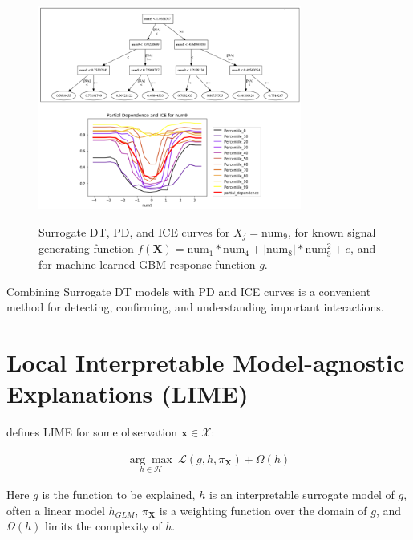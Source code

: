 \documentclass{article}
\begin{document}
\begin{figure}[htb]
	\begin{center}
		\label{fig:dt_surrogate_pdp_ice}
		\includegraphics[height=190pt]{img/dt_surrogate2_pdp_ice.png}
		\caption{Surrogate DT, PD, and ICE curves for $ X_j = \text{num}_9$, for known signal generating function $f(\mathbf{X}) = \text{num} _1 * \text{num}_4 + |\text{num}_8| * \text{num}_9^2 + e$, and for machine-learned GBM response function $g$.}
	\end{center}
\end{figure}

Combining Surrogate DT models with PD and ICE curves is a convenient method for detecting, confirming, and understanding important interactions.

\section{Local Interpretable Model-agnostic Explanations (LIME)}
\label{sec:lime}

\cite{lime} defines LIME for some observation $\mathbf{x} \in \mathcal{X}$:

\begin{equation}
\begin{aligned}
\underset{h \in \mathcal{H}}{\arg\max}\:\mathcal{L}(g, h, \pi_{\mathbf{X}}) + \Omega(h)
\end{aligned}
\end{equation}

Here $g$ is the function to be explained, $h$ is an interpretable surrogate model of $g$, often a linear model $h_{GLM}$, $\pi_{\mathbf{X}}$ is a weighting function over the domain of $g$, and $\Omega(h)$ limits the complexity of $h$.
\end{document}
